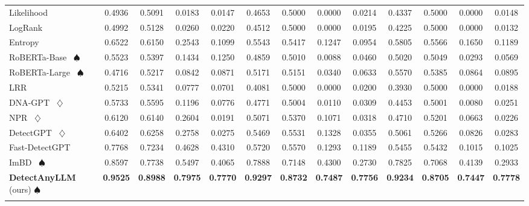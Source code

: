 \begin{table*}[htbp]
{\begin{tabular}{l|cccc|cccc|cccc}
    \hline
    Likelihood~\cite{likelihood} & 0.4936 & 0.5091 & 0.0183 & 0.0147 & 0.4653 & 0.5000 & 0.0000 & 0.0214 & 0.4337 & 0.5000 & 0.0000 & 0.0148 \\
    LogRank~\cite{logrank} & 0.4992 & 0.5128 & 0.0260 & 0.0220 & 0.4512 & 0.5000 & 0.0000 & 0.0195 & 0.4225 & 0.5000 & 0.0000 & 0.0132 \\
    Entropy~\cite{entropy} & 0.6522 & 0.6150 & 0.2543 & 0.1099 & 0.5543 & 0.5417 & 0.1247 & 0.0954 & 0.5805 & 0.5566 & 0.1650 & 0.1189 \\
    RoBERTa-Base~\cite{roberta} $\spadesuit$ & 0.5523 & 0.5397 & 0.1434 & 0.1250 & 0.4859 & 0.5010 & 0.0088 & 0.0460 & 0.5020 & 0.5049 & 0.0293 & 0.0569 \\
    RoBERTa-Large~\cite{roberta} $\spadesuit$ & 0.4716 & 0.5217 & 0.0842 & 0.0871 & 0.5171 & 0.5151 & 0.0340 & 0.0633 & 0.5570 & 0.5385 & 0.0864 & 0.0895 \\
    LRR~\cite{lrrandnpr} & 0.5215 & 0.5341 & 0.0777 & 0.0701 & 0.4081 & 0.5000 & 0.0000 & 0.0200 & 0.3930 & 0.5000 & 0.0000 & 0.0188 \\
    DNA-GPT~\cite{dna-gpt} $\diamondsuit$ & 0.5733 & 0.5595 & 0.1196 & 0.0776 & 0.4771 & 0.5004 & 0.0110 & 0.0309 & 0.4453 & 0.5001 & 0.0080 & 0.0251 \\
    NPR~\cite{lrrandnpr} $\diamondsuit$ & 0.6120 & 0.6140 & 0.2604 & 0.0191 & 0.5071 & 0.5370 & 0.1071 & 0.0318 & 0.4710 & 0.5201 & 0.0663 & 0.0226 \\
    DetectGPT~\cite{detectgpt} $\diamondsuit$ & 0.6402 & 0.6258 & 0.2758 & 0.0275 & 0.5469 & 0.5531 & 0.1328 & 0.0355 & 0.5061 & 0.5266 & 0.0826 & 0.0283 \\
    Fast-DetectGPT~\cite{fastdetectgpt} & 0.7768 & 0.7234 & 0.4628 & 0.4310 & 0.5720 & 0.5570 & 0.1293 & 0.1189 & 0.5455 & 0.5432 & 0.1015 & 0.1025 \\
    ImBD~\cite{imbd} $\spadesuit$ & 0.8597 & 0.7738 & 0.5497 & 0.4065 & 0.7888 & 0.7148 & 0.4300 & 0.2730 & 0.7825 & 0.7068 & 0.4139 & 0.2933 \\
    \hdashline
    
    \hdashline
    \rowcolor[HTML]{fff5f4}
    
    \textbf{DetectAnyLLM} (ours) $\spadesuit$ & \textbf{0.9525} & \textbf{0.8988} & \textbf{0.7975} & \textbf{0.7770} & \textbf{0.9297} & \textbf{0.8732} & \textbf{0.7487} & \textbf{0.7756} & \textbf{0.9234} & \textbf{0.8705} & \textbf{0.7447} & \textbf{0.7778} \\
    
    \rowcolor[HTML]{fff5f4}
    

\end{tabular}}
\end{table*}
